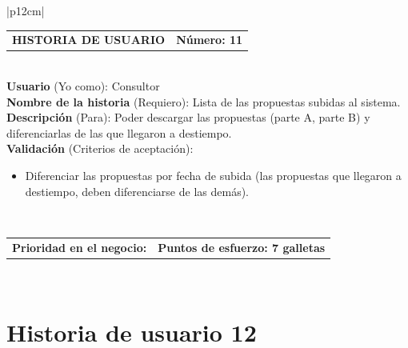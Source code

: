 \documentclass[11pt,letterpaper]{report}
\begin{document}
	\begin{center}	
		\begin{tabular}{|p{12cm}|}
			\hline
			\begin{tabular}{c|c}
				\textbf{HISTORIA DE USUARIO} & \textbf{Número: 11} \\
			\end{tabular} \\ \hline
			\textbf{Usuario} (Yo como): Consultor \\ \hline
			\textbf{Nombre de la historia} (Requiero): Lista de las propuestas subidas al sistema. \\ \hline
			\textbf{Descripción} (Para): Poder descargar las propuestas (parte A, parte B) y diferenciarlas de las que llegaron a destiempo. \\ \hline
			\textbf{Validación} (Criterios de aceptación): \\
			\begin{minipage}{12cm}
				\begin{itemize}
					\item Diferenciar las propuestas por fecha de subida (las propuestas que llegaron a destiempo, deben diferenciarse de las demás).
				\end{itemize}
			\end{minipage} \\ \hline
			\begin{tabular}{p{6cm}|c}
				\textbf{Prioridad en el negocio: } & \textbf{Puntos de esfuerzo: 7 galletas} \\
			\end{tabular} \\ \hline
		\end{tabular}
	\end{center}
	
	\section{Historia de usuario 12}
	
\end{document}
